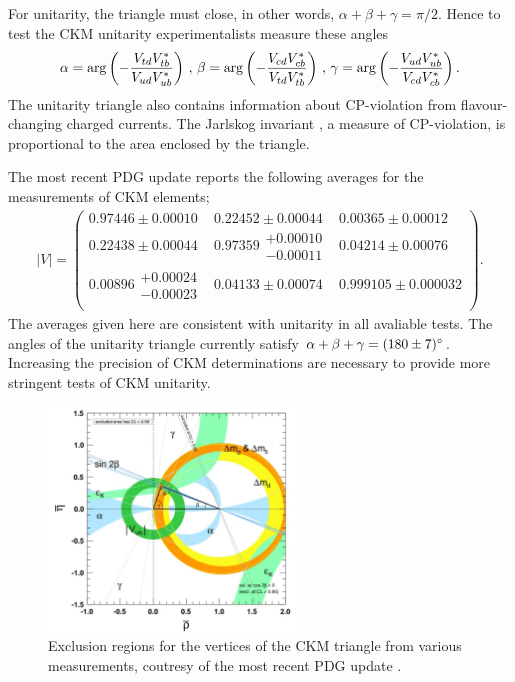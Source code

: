 For unitarity, the triangle must close, in other words, $\alpha+\beta+\gamma = \pi/2$. Hence to test the CKM unitarity experimentalists measure these angles
\begin{align}
  \alpha = \arg \left( -{V_{td}V_{tb}^*\over V_{ud}V_{ub}^*}\right) \,,\,
  \beta = \arg \left( -{V_{cd}V_{cb}^*\over V_{td}V_{tb}^*} \right) \,,\,
  \gamma = \arg \left( -{V_{ud}V_{ub}^*\over V_{cd}V_{cb}^*} \right).
\end{align}
The unitarity triangle also contains information about CP-violation from flavour-changing charged currents. The Jarlskog invariant%
, a measure of CP-violation, is proportional to the area enclosed by the triangle.

The most recent PDG update \cite{PhysRevD.98.030001} reports the following averages for the measurements of CKM elements;
\begin{align}
  |V| = \begin{pmatrix}
    0.97446\pm 0.00010 & 0.22452\pm 0.00044 & 0.00365\pm 0.00012 \\
    0.22438\pm 0.00044 & 0.97359\substack{+0.00010\\-0.00011} & 0.04214\pm 0.00076 \\
    0.00896\substack{+0.00024\\-0.00023} & 0.04133\pm 0.00074 & 0.999105\pm 0.000032 \\
  \end{pmatrix}.
\end{align}
The averages given here are consistent with unitarity in all avaliable tests. %
The angles of the unitarity triangle currently satisfy $\alpha+\beta+\gamma = (180\pm 7)\degree$. Increasing the precision of CKM determinations are necessary to provide more stringent tests of CKM unitarity.

\begin{figure}
  \vspace{-10pt}
  \begin{center}
    \includegraphics[width=0.6\textwidth]{images/ckmpdg.jpg}
  \end{center}
  \vspace{-25pt}
  \caption{Exclusion regions for the vertices of the CKM triangle from various measurements, coutresy of the most recent PDG update \cite{PhysRevD.98.030001}.}
  \label{fig:ckmpdg}
\end{figure}

